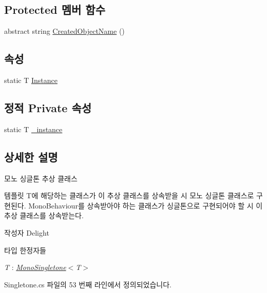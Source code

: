 \subsection*{Protected 멤버 함수}
\begin{DoxyCompactItemize}
\item 
abstract string \hyperlink{class_m_c_n_1_1_mono_singletone_a3dde6c2c7e6a3723102f059a043aed22}{Created\+Object\+Name} ()
\end{DoxyCompactItemize}
\subsection*{속성}
\begin{DoxyCompactItemize}
\item 
static T \hyperlink{class_m_c_n_1_1_mono_singletone_aa50c027cca64cf4ad30c1ee5c83e0b78}{Instance}
\end{DoxyCompactItemize}
\subsection*{정적 Private 속성}
\begin{DoxyCompactItemize}
\item 
static T \hyperlink{class_m_c_n_1_1_mono_singletone_a790a4dfd828c6e4f008ad64d33d61ac0}{\+\_\+instance}
\end{DoxyCompactItemize}


\subsection{상세한 설명}
모노 싱글톤 추상 클래스 

템플릿 T에 해당하는 클래스가 이 추상 클래스를 상속받을 시 모노 싱글톤 클래스로 구현된다. Mono\+Behaviour를 상속받아야 하는 클래스가 싱글톤으로 구현되어야 할 시 이 추상 클래스를 상속받는다. \begin{DoxyAuthor}{작성자}
Delight 
\end{DoxyAuthor}
\begin{Desc}
\item[타입 한정자들]\begin{description}
\item[{\em T} : {\em \hyperlink{class_m_c_n_1_1_mono_singletone}{Mono\+Singletone}$<$T$>$}]\end{description}
\end{Desc}


Singletone.\+cs 파일의 53 번째 라인에서 정의되었습니다.




